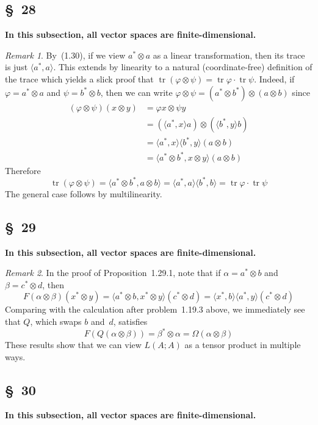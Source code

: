 \documentclass[letterpaper,12pt]{article}
\DeclareMathOperator{\tr}{tr}
\newcommand{\mult}{\cdot}
\newcommand{\tprod}{\otimes}
\newcommand{\sprod}[2]{\langle#1,#2\rangle}
\theoremstyle{definition}
\theoremstyle{remark}
\newtheorem*{rmk}{Remark}
\begin{document}
\subsection*{\S~28}
\textbf{In this subsection, all vector spaces are finite-dimensional.}

\begin{rmk}
By~(1.30), if we view \(a^*\tprod a\) as a linear transformation, then its trace is just \(\sprod{a^*}{a}\). This extends by linearity to a natural (coordinate-free) definition of the trace which yields a slick proof that \(\tr(\varphi\tprod\psi)=\tr\varphi\mult\tr\psi\). Indeed, if \(\varphi=a^*\tprod a\) and \(\psi=b^*\tprod b\), then we can write \(\varphi\tprod\psi=(a^*\tprod b^*)\tprod(a\tprod b)\) since
\begin{align*}
(\varphi\tprod\psi)(x\tprod y)&=\varphi x\tprod\psi y\\
	&=(\sprod{a^*}{x}a)\tprod(\sprod{b^*}{y}b)\\
	&=\sprod{a^*}{x}\sprod{b^*}{y}(a\tprod b)\\
	&=\sprod{a^*\tprod b^*}{x\tprod y}(a\tprod b)
\end{align*}
Therefore
\[\tr(\varphi\tprod\psi)=\sprod{a^*\tprod b^*}{a\tprod b}=\sprod{a^*}{a}\sprod{b^*}{b}=\tr\varphi\mult\tr\psi\]
The general case follows by multilinearity.
\end{rmk}

\subsection*{\S~29}
\textbf{In this subsection, all vector spaces are finite-dimensional.}

\begin{rmk}
In the proof of Proposition~1.29.1, note that if \(\alpha=a^*\tprod b\) and \(\beta=c^*\tprod d\), then
\[F(\alpha\tprod\beta)(x^*\tprod y)=\sprod{a^*\tprod b}{x^*\tprod y}(c^*\tprod d)=\sprod{x^*}{b}\sprod{a^*}{y}(c^*\tprod d)\]
Comparing with the calculation after problem~1.19.3 above, we immediately see that \(Q\), which swaps \(b\) and~\(d\), satisfies
\[F(Q(\alpha\tprod\beta))=\beta^*\tprod\alpha=\Omega(\alpha\tprod\beta)\]
These results show that we can view \(L(A;A)\) as a tensor product in multiple ways.
\end{rmk}

\subsection*{\S~30}
\textbf{In this subsection, all vector spaces are finite-dimensional.}
\end{document}

